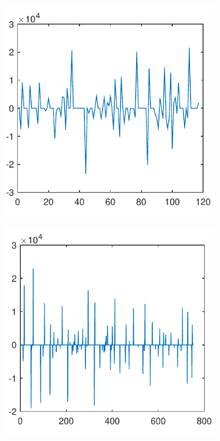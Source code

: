 \documentclass[sigconf]{acmart}
\begin{document}
	\begin{figure}[tp]
		\centering
		\begin{subfigure}[t]{0.45\linewidth}
			\centering
			\includegraphics[width=0.95\linewidth]{fig/total_life_8}
			\label{fig:3.1a}
		\end{subfigure}
		\begin{subfigure}[t]{0.45\linewidth}
			\centering
			\includegraphics[width=0.95\linewidth]{fig/total_life_20}

\end{subfigure}
\end{figure}
\end{document}
